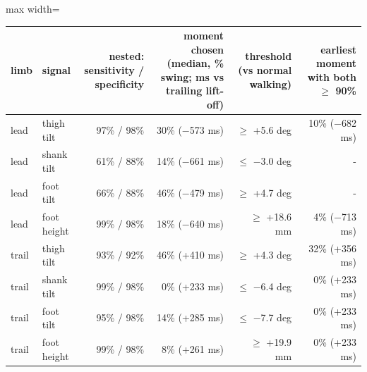 \begin{adjustbox}{max width=\textwidth}
{\scriptsize
\begin{tabular}{llrrrr}
\toprule
\textbf{limb} & \textbf{signal} & \textbf{nested: sensitivity / specificity} & \textbf{moment chosen (median, \% swing; ms vs trailing lift-off)} & \textbf{threshold (vs normal walking)} & \textbf{earliest moment with both $\geq$ 90\%} \\
\midrule
lead & thigh tilt & 97\% / 98\% & 30\% ($-$573 ms) & $\geq$ +5.6 deg & 10\% ($-$682 ms) \\
lead & shank tilt & 61\% / 88\% & 14\% ($-$661 ms) & $\leq$ $-$3.0 deg & - \\
lead & foot tilt & 66\% / 88\% & 46\% ($-$479 ms) & $\geq$ +4.7 deg & - \\
lead & foot height & 99\% / 98\% & 18\% ($-$640 ms) & $\geq$ +18.6 mm & 4\% ($-$713 ms) \\
trail & thigh tilt & 93\% / 92\% & 46\% (+410 ms) & $\geq$ +4.3 deg & 32\% (+356 ms) \\
trail & shank tilt & 99\% / 98\% & 0\% (+233 ms) & $\leq$ $-$6.4 deg & 0\% (+233 ms) \\
trail & foot tilt & 95\% / 98\% & 14\% (+285 ms) & $\leq$ $-$7.7 deg & 0\% (+233 ms) \\
trail & foot height & 99\% / 98\% & 8\% (+261 ms) & $\geq$ +19.9 mm & 0\% (+233 ms) \\
\bottomrule
\end{tabular}
}
\end{adjustbox}
